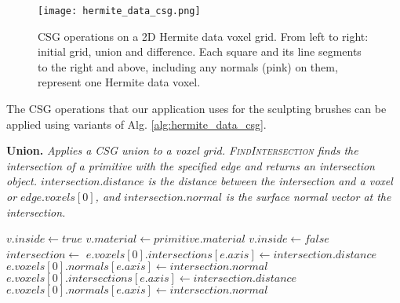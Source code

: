 \begin{figure}
\centering
\captionsetup{width=0.8\textwidth}
\texttt{[image: hermite\_data\_csg.png]}
\caption{CSG operations on a 2D Hermite data voxel grid. From left to right: initial grid, union and difference. Each square and its line segments to the right and above,
including any normals (pink) on them, represent one Hermite data voxel.}
\label{fig:hermite_data_csg}
\end{figure}

The CSG operations that our application uses for the sculpting brushes can be applied using variants of Alg. \ref{alg:hermite_data_csg}. 

\begin{algorithm}[H]
\small
\caption{\textbf{Union.} \textit{Applies a CSG union to a voxel grid. \textsc{FindIntersection} finds the intersection of a primitive with the specified edge
and returns an intersection object. $intersection.distance$ is the distance between the intersection and a voxel or $edge.voxels[0]$, and $intersection.normal$ is the 
surface normal vector at the intersection.}}\label{alg:hermite_data_csg}
\begin{algorithmic}[1]
				\State $v.inside \gets true$
				\State $v.material \gets primitive.material$
			\Else
				\State $v.inside \gets false$
			\EndIf
	\EndFor
			\State $intersection \gets$ 
				\State $e.voxels[0].intersections[e.axis] \gets intersection.distance$
				\State $e.voxels[0].normals[e.axis] \gets intersection.normal$
				\State $e.voxels[0].intersections[e.axis] \gets intersection.distance$
				\State $e.voxels[0].normals[e.axis] \gets intersection.normal$
			\EndIf
		\EndIf
	\EndFor
\EndProcedure
\end{algorithmic}
\end{algorithm}

